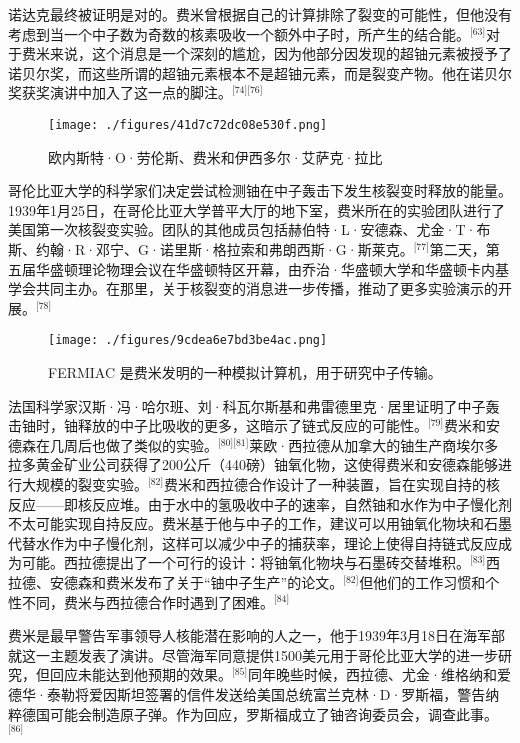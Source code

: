 诺达克最终被证明是对的。费米曾根据自己的计算排除了裂变的可能性，但他没有考虑到当一个中子数为奇数的核素吸收一个额外中子时，所产生的结合能。\(^\text{[63]}\)对于费米来说，这个消息是一个深刻的尴尬，因为他部分因发现的超铀元素被授予了诺贝尔奖，而这些所谓的超铀元素根本不是超铀元素，而是裂变产物。他在诺贝尔奖获奖演讲中加入了这一点的脚注。\(^\text{[74][76]}\)
\begin{figure}[ht]
\centering
\texttt{[image: ./figures/41d7c72dc08e530f.png]}
\caption{欧内斯特·O·劳伦斯、费米和伊西多尔·艾萨克·拉比} \label{fig_ELK_9}
\end{figure}
哥伦比亚大学的科学家们决定尝试检测铀在中子轰击下发生核裂变时释放的能量。1939年1月25日，在哥伦比亚大学普平大厅的地下室，费米所在的实验团队进行了美国第一次核裂变实验。团队的其他成员包括赫伯特·L·安德森、尤金·T·布斯、约翰·R·邓宁、G·诺里斯·格拉索和弗朗西斯·G·斯莱克。\(^\text{[77]}\)第二天，第五届华盛顿理论物理会议在华盛顿特区开幕，由乔治·华盛顿大学和华盛顿卡内基学会共同主办。在那里，关于核裂变的消息进一步传播，推动了更多实验演示的开展。\(^\text{[78]}\)
\begin{figure}[ht]
\centering
\texttt{[image: ./figures/9cdea6e7bd3be4ac.png]}
\caption{FERMIAC 是费米发明的一种模拟计算机，用于研究中子传输。} \label{fig_ELK_10}
\end{figure}
法国科学家汉斯·冯·哈尔班、刘·科瓦尔斯基和弗雷德里克·居里证明了中子轰击铀时，铀释放的中子比吸收的更多，这暗示了链式反应的可能性。\(^\text{[79]}\)费米和安德森在几周后也做了类似的实验。\(^\text{[80][81]}\)莱欧·西拉德从加拿大的铀生产商埃尔多拉多黄金矿业公司获得了200公斤（440磅）铀氧化物，这使得费米和安德森能够进行大规模的裂变实验。\(^\text{[82]}\)费米和西拉德合作设计了一种装置，旨在实现自持的核反应——即核反应堆。由于水中的氢吸收中子的速率，自然铀和水作为中子慢化剂不太可能实现自持反应。费米基于他与中子的工作，建议可以用铀氧化物块和石墨代替水作为中子慢化剂，这样可以减少中子的捕获率，理论上使得自持链式反应成为可能。西拉德提出了一个可行的设计：将铀氧化物块与石墨砖交替堆积。\(^\text{[83]}\)西拉德、安德森和费米发布了关于“铀中子生产”的论文。\(^\text{[82]}\)但他们的工作习惯和个性不同，费米与西拉德合作时遇到了困难。\(^\text{[84]}\)

费米是最早警告军事领导人核能潜在影响的人之一，他于1939年3月18日在海军部就这一主题发表了演讲。尽管海军同意提供1500美元用于哥伦比亚大学的进一步研究，但回应未能达到他预期的效果。\(^\text{[85]}\)同年晚些时候，西拉德、尤金·维格纳和爱德华·泰勒将爱因斯坦签署的信件发送给美国总统富兰克林·D·罗斯福，警告纳粹德国可能会制造原子弹。作为回应，罗斯福成立了铀咨询委员会，调查此事。\(^\text{[86]}\)

